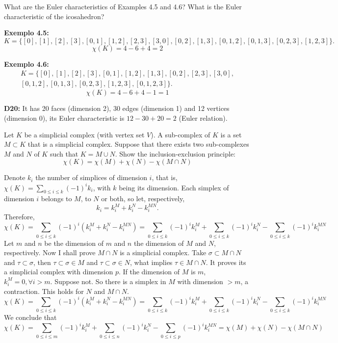 \begin{exercise}
    What are the Euler characteristics of Examples 4.5 and 4.6? What is the Euler characteristic of the icosahedron?
\end{exercise}

\textbf{Exemplo 4.5:} 
$$K = \{[0], [1], [2], [3], [0, 1], [1, 2], [2, 3], [3, 0], [0, 2], [1, 3], [0, 1, 2], [0, 1, 3], [0, 2, 3], [1, 2, 3]\}.$$
$$
\chi (K) = 4 - 6 + 4 = 2
$$

\textbf{Exemplo 4.6:}
\begin{multline*}
    K = \{[0], [1],[2], [3], [0, 1], [1, 2], [1,3], [0,2] ,[2, 3], [3, 0], \\
    [0, 1, 2], [0, 1, 3], [0, 2, 3], [1, 2, 3], [0, 1, 2, 3]\}.    
\end{multline*}
$$
\chi (K) = 4 - 6 + 4 - 1 = 1
$$

\textbf{D20:} It has 20 faces (dimension 2), 30 edges (dimension 1) and 12
vertices (dimension 0), its Euler characteristic is $12 - 30 + 20 = 2$ (Euler
relation). 

\noindent\linia

\begin{exercise}
    Let $K$ be a simplicial complex (with vertex set $V$). A sub-complex of
    $K$ is a set $M \subset K$ that is a simplicial complex. Suppose that
    there exists two sub-complexes $M$ and $N$ of $K$ such that $K = M \cup
    N$. Show the inclusion-exclusion principle:
    $$
    \chi(K) = \chi(M) + \chi(N) - \chi(M \cap N)
    $$
\end{exercise}

Denote $k_i$ the number of simplices of dimension $i$, that is, $\chi (K) =
\sum_{0 \le i \le k} (-1)^i k_i$, with $k$ being its dimension. Each simplex of dimension $i$ belongs to
$M$, to $N$ or both, so let, respectively, 
$$k_i = k_i^M + k_i^N - k_i^{MN}.$$
Therefore, 
$$
\chi(K) = \sum_{0 \le i \le k} (-1)^i (k_i^M + k_i^N - k_i^{MN}) = \sum_{0 \le i \le k}(-1)^i k_i^M + \sum_{0 \le i \le k}(-1)^i k_i^N - \sum_{0 \le i \le k}(-1)^i k_i^{MN} 
$$
Let $m$ and $n$ be the dimension of $m$ and $n$ the dimension of $M$ and $N$,
respectively. Now I shall prove $M \cap N$ is a simplicial complex. Take
$\sigma \subset M \cap N$ and $\tau \subset \sigma$, then $\tau \subset \sigma
\in M$ and $\tau \subset \sigma \in N$, what implies $\tau \in M \cap N$. It
proves its a simplicial complex with dimension $p$. If the dimension of $M$ is
$m$, $k_i^M = 0, \forall i > m$. Suppose not. So there is a simplex in $M$
with dimension $> m$, a contraction. This holds for $N$ and $M \cap N$. 
$$
\chi(K) = \sum_{0 \le i \le k} (-1)^i (k_i^M + k_i^N - k_i^{MN}) = \sum_{0 \le i \le k}(-1)^i k_i^M + \sum_{0 \le i \le k}(-1)^i k_i^N - \sum_{0 \le i \le k}(-1)^i k_i^{MN} 
$$
We conclude that 
$$
\chi(K) = \sum_{0 \le i \le m}(-1)^i k_i^M + \sum_{0 \le i \le n}(-1)^i k_i^N - \sum_{0 \le i \le p}(-1)^i k_i^{MN} = \chi(M) + \chi(N) - \chi(M \cap N)
$$

